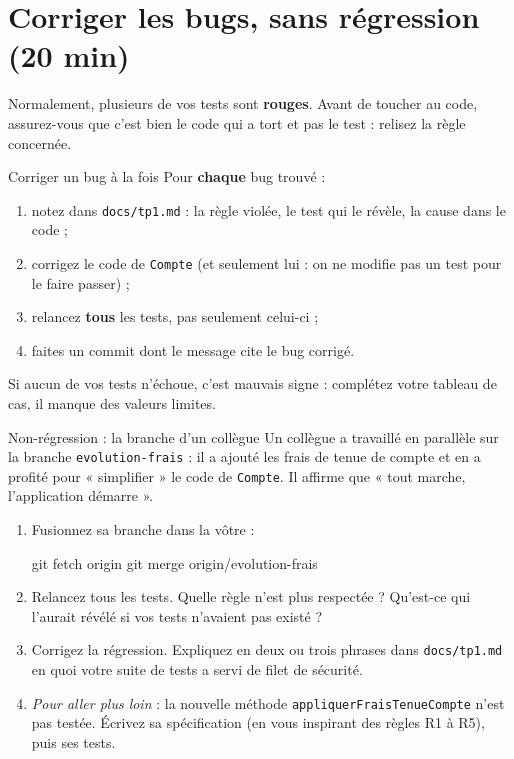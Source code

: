 \documentclass[11pt]{article}
\begin{document}
\section{Corriger les bugs, sans régression (20 min)}

Normalement, plusieurs de vos tests sont \textbf{rouges}. Avant de toucher au code, assurez-vous que c'est bien le code qui a tort et pas le test : relisez la règle concernée.

\begin{exobox}{Corriger un bug à la fois}
Pour \textbf{chaque} bug trouvé :
\begin{enumerate}[leftmargin=1.4em]
  \item notez dans \texttt{docs/tp1.md} : la règle violée, le test qui le révèle, la cause dans le code ;
  \item corrigez le code de \texttt{Compte} (et seulement lui : on ne modifie pas un test pour le faire passer) ;
  \item relancez \textbf{tous} les tests, pas seulement celui-ci ;
  \item faites un commit dont le message cite le bug corrigé.
\end{enumerate}
Si aucun de vos tests n'échoue, c'est mauvais signe : complétez votre tableau de cas, il manque des valeurs limites.
\end{exobox}

\begin{exobox}{Non-régression : la branche d'un collègue}
Un collègue a travaillé en parallèle sur la branche \texttt{evolution-frais} : il a ajouté les frais de tenue de compte et en a profité pour « simplifier » le code de \texttt{Compte}. Il affirme que « tout marche, l'application démarre ».
\begin{enumerate}[leftmargin=1.4em]
  \item Fusionnez sa branche dans la vôtre :
\begin{codebox}
git fetch origin
git merge origin/evolution-frais
\end{codebox}
  \item Relancez tous les tests. Quelle règle n'est plus respectée ? Qu'est-ce qui l'aurait révélé si vos tests n'avaient pas existé ?
  \item Corrigez la régression. Expliquez en deux ou trois phrases dans \texttt{docs/tp1.md} en quoi votre suite de tests a servi de filet de sécurité.
  \item \textit{Pour aller plus loin} : la nouvelle méthode \texttt{appliquerFraisTenueCompte} n'est pas testée. Écrivez sa spécification (en vous inspirant des règles R1 à R5), puis ses tests.
\end{enumerate}
\end{exobox}
\end{document}

